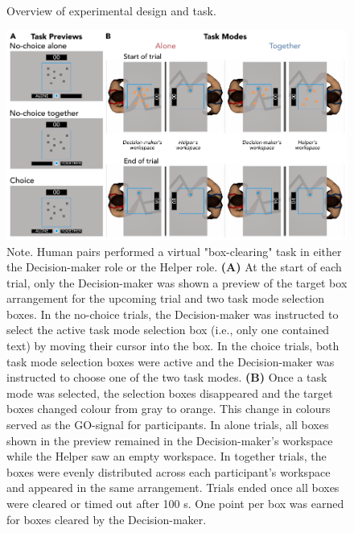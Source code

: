 \documentclass[
  man,
  floatsintext,
  longtable,
  nolmodern,
  notxfonts,
  notimes,
  mask,
  colorlinks=true,linkcolor=blue,citecolor=blue,urlcolor=blue]{apa7}
\begin{document}
\clearpage

\begin{figure}[htbp]
\caption{Overview of experimental design and task.}
\centering
\includegraphics[scale=1.00]{../../figs/fig1.pdf}
\setlength{\belowcaptionskip}{-2em}
\caption*{\singlespacing \small Note. \normalfont Human pairs performed a virtual "box-clearing" task in either the Decision-maker role or the Helper role. \textbf{(A)} At the start of each trial, only the Decision-maker was shown a preview of the target box arrangement for the upcoming trial and two task mode selection boxes. In the no-choice trials, the Decision-maker was instructed to select the active task mode selection box (i.e., only one contained text) by moving their cursor into the box. In the choice trials, both task mode selection boxes were active and the Decision-maker was instructed to choose one of the two task modes. \textbf{(B)} Once a task mode was selected, the selection boxes disappeared and the target boxes changed colour from gray to orange. This change in colours served as the GO-signal for participants. In alone trials, all boxes shown in the preview remained in the Decision-maker's workspace while the Helper saw an empty workspace. In together trials, the boxes were evenly distributed across each participant's workspace and appeared in the same arrangement. Trials ended once all boxes were cleared or timed out after 100 s. One point per box was earned for boxes cleared by the Decision-maker.}
\label{fig:fig1}
\end{figure}

\clearpage
\end{document}
